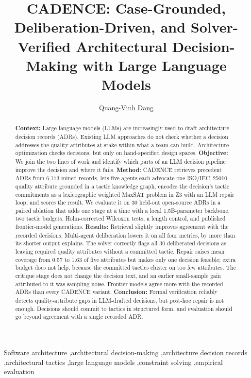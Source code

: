 \documentclass[preprint,12pt,authoryear]{elsarticle}
\renewcommand{\_}{\textunderscore\allowbreak{}}
\begin{document}
\begin{frontmatter}

\title{CADENCE: Case-Grounded, Deliberation-Driven, and Solver-Verified Architectural Decision-Making with Large Language Models}

\author{Quang-Vinh Dang}
\address{British University Vietnam, Hung Yen, Vietnam}

\begin{abstract}
\textbf{Context:} Large language models (LLMs) are increasingly used to draft architecture decision records (ADRs). Existing LLM approaches do not check whether a decision addresses the quality attributes at stake within what a team can build. Architecture optimization checks decisions, but only on hand-specified design spaces.
\textbf{Objective:} We join the two lines of work and identify which parts of an LLM decision pipeline improve the decision and where it fails.
\textbf{Method:} CADENCE retrieves precedent ADRs from 6{,}173 mined records, lets five agents each advocate one ISO/IEC~25010 quality attribute grounded in a tactic knowledge graph, encodes the decision's tactic commitments as a lexicographic weighted MaxSAT problem in Z3 with an LLM repair loop, and scores the result. We evaluate it on 30 held-out open-source ADRs in a paired ablation that adds one stage at a time with a local 1.5B-parameter backbone, two tactic budgets, Holm-corrected Wilcoxon tests, a length control, and published frontier-model generations.
\textbf{Results:} Retrieval slightly improves agreement with the recorded decisions. Multi-agent deliberation lowers it on all four metrics, by more than its shorter output explains. The solver correctly flags all 30 deliberated decisions as leaving required quality attributes without a committed tactic. Repair raises mean coverage from 0.57 to 1.63 of five attributes but makes only one decision feasible; extra budget does not help, because the committed tactics cluster on too few attributes. The critique stage does not change the decision text, and an earlier small-sample gain attributed to it was sampling noise. Frontier models agree more with the recorded ADRs than every CADENCE variant.
\textbf{Conclusion:} Formal verification reliably detects quality-attribute gaps in LLM-drafted decisions, but post-hoc repair is not enough. Decisions should commit to tactics in structured form, and evaluation should go beyond agreement with a single recorded ADR.
\end{abstract}

\begin{keyword}
Software architecture \sep architectural decision-making \sep architecture decision records \sep architectural tactics \sep large language models \sep constraint solving \sep empirical evaluation
\end{keyword}

\end{frontmatter}
\end{document}
